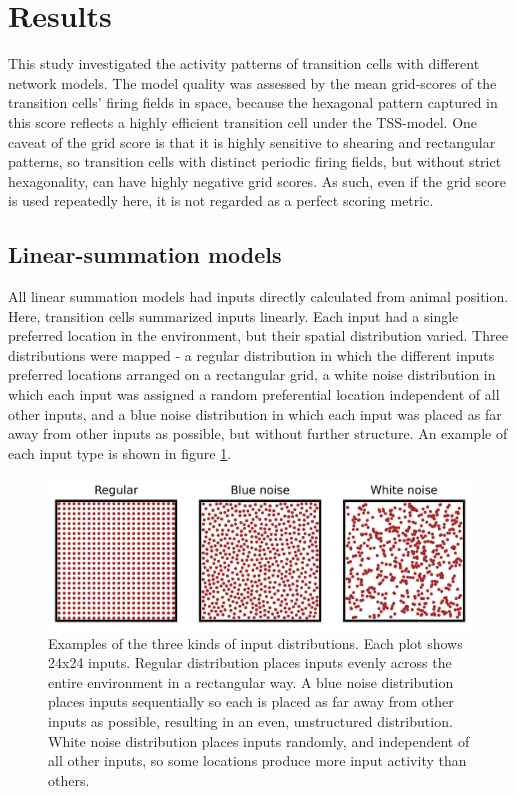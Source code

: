 \documentclass{article}
\begin{document}
    \section{Results}

    This study investigated the activity patterns of transition cells with different network models. The model quality was assessed by the mean grid-scores of the transition cells’ firing fields in space, because the hexagonal pattern captured in this score reflects a highly efficient transition cell under the TSS-model. One caveat of the grid score is that it is highly sensitive to shearing and rectangular patterns, so transition cells with distinct periodic firing fields, but without strict hexagonality, can have highly negative grid scores. As such, even if the grid score is used repeatedly here, it is not regarded as a perfect scoring metric.

    \subsection{Linear-summation models}
    All linear summation models had inputs directly calculated from animal position. Here, transition cells summarized inputs linearly. Each input had a single preferred location in the environment, but their spatial distribution varied. Three distributions were mapped - a regular distribution in which the different inputs preferred locations arranged on a rectangular grid, a white noise distribution in which each input was assigned a random preferential location independent of all other inputs, and a blue noise distribution in which each input was placed as far away from other inputs as possible, but without further structure. An example of each input type is shown in figure \ref{distribution_plot}.

    \begin{figure}[H]
        \centering
        \includegraphics[width=15cm]{distribution_plot.png}
        \caption{Examples of the three kinds of input distributions. Each plot shows 24x24 inputs. Regular distribution places inputs evenly across the entire environment in a rectangular way. A blue noise distribution places inputs sequentially so each is placed as far away from other inputs as possible, resulting in an even, unstructured distribution. White noise distribution places inputs randomly, and independent of all other inputs, so some locations produce more input activity than others.}
        \label{distribution_plot}
    \end{figure}
\end{document}
